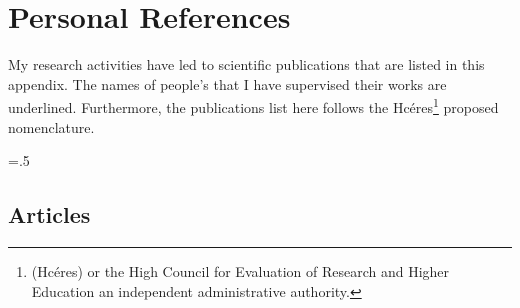 
\chapter{Personal References}\label{chap:MyRef}
My research activities have led to scientific publications that are listed in this appendix.
The names of people's that I have supervised their works are underlined.
Furthermore, the publications list here follows the Hcéres\footnote{ (Hcéres) or the High Council for Evaluation of Research and Higher Education  an independent administrative authority.} proposed nomenclature\;\cite{2018_hceres}.

\sectionskipamount=.5\sectionskipamount


\section[Articles]{Articles}


